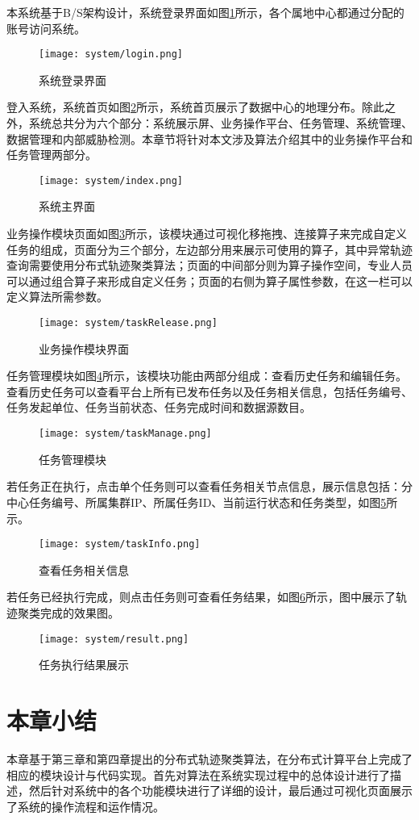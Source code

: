 本系统基于B/S架构设计，系统登录界面如图\ref{login}所示，各个属地中心都通过分配的账号访问系统。
\begin{figure}[H]
	\texttt{[image: system/login.png]}
	\caption{系统登录界面}
	\label{login}
\end{figure}


登入系统，系统首页如图\ref{index}所示，系统首页展示了数据中心的地理分布。除此之外，系统总共分为六个部分：系统展示屏、业务操作平台、任务管理、系统管理、数据管理和内部威胁检测。本章节将针对本文涉及算法介绍其中的业务操作平台和任务管理两部分。
\begin{figure}[H]
	\texttt{[image: system/index.png]}
	\caption{系统主界面}
	\label{index}
\end{figure}

业务操作模块页面如图\ref{taskRelease3}所示，该模块通过可视化移拖拽、连接算子来完成自定义任务的组成，页面分为三个部分，左边部分用来展示可使用的算子，其中异常轨迹查询需要使用分布式轨迹聚类算法；页面的中间部分则为算子操作空间，专业人员可以通过组合算子来形成自定义任务；页面的右侧为算子属性参数，在这一栏可以定义算法所需参数。
\begin{figure}[H]
	\texttt{[image: system/taskRelease.png]}
	\caption{业务操作模块界面}
	\label{taskRelease3}
\end{figure}

任务管理模块如图\ref{taskManage}所示，该模块功能由两部分组成：查看历史任务和编辑任务。查看历史任务可以查看平台上所有已发布任务以及任务相关信息，包括任务编号、任务发起单位、任务当前状态、任务完成时间和数据源数目。
\begin{figure}[H]
	\texttt{[image: system/taskManage.png]}
	\caption{任务管理模块}
	\label{taskManage}
\end{figure}

若任务正在执行，点击单个任务则可以查看任务相关节点信息，展示信息包括：分中心任务编号、所属集群IP、所属任务ID、当前运行状态和任务类型，如图\ref{taskInfo}所示。
\begin{figure}[H]
	\texttt{[image: system/taskInfo.png]}
	\caption{查看任务相关信息}
	\label{taskInfo}
\end{figure}

若任务已经执行完成，则点击任务则可查看任务结果，如图\ref{result}所示，图中展示了轨迹聚类完成的效果图。
\begin{figure}[H]
	\texttt{[image: system/result.png]}
	\caption{任务执行结果展示}
	\label{result}
\end{figure}

\section{本章小结}
本章基于第三章和第四章提出的分布式轨迹聚类算法，在分布式计算平台上完成了相应的模块设计与代码实现。首先对算法在系统实现过程中的总体设计进行了描述，然后针对系统中的各个功能模块进行了详细的设计，最后通过可视化页面展示了系统的操作流程和运作情况。